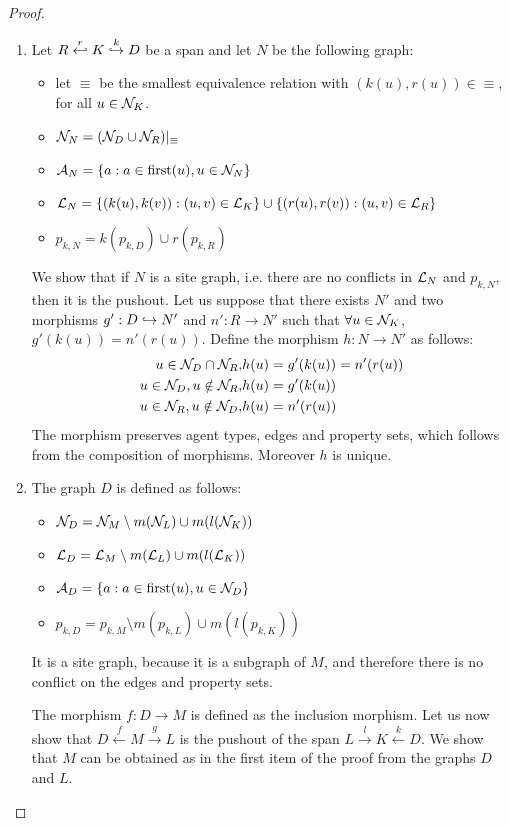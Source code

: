\begin{proof}
  \begin{enumerate}
  \item Let $R\overset{r}{\hookleftarrow}K\overset{k}{\hookrightarrow} D$ be a span and let $N$ be the following graph:
    \begin{itemize}
    \item let $\equiv$ be the smallest equivalence relation with $(k(u),r(u))\in\equiv$, for all $u\in\mathcal{N}_K$.
    \item $\mathcal{N}_N = (\mathcal{N}_D\cup \mathcal{N}_R)|_{\equiv}$
    \item $\mathcal{A}_N = \{a: a\in \text{first}(u), u\in\mathcal{N}_N\}$
    \item $\mathcal{L}_N = \{(k(u),k(v)) : (u,v)\in\mathcal{L}_K\}\cup\{(r(u),r(v)) : (u,v)\in\mathcal{L}_R\}$
    \item $p_{k,N} = k(p_{k,D}) \cup r(p_{k,R})$
    \end{itemize}
    We show that if $N$ is a site graph, i.e. there are no conflicts in $\mathcal{L}_N$ and $p_{k,N}$, then it is the pushout. Let us suppose that there exists $N'$ and two morphisms $g':D\hookrightarrow N'$ and $n':R\to N'$ such that $\forall u\in\mathcal{N}_K$, $g'(k(u)) = n'(r(u))$. Define the morphism $h:N\to N'$ as follows:
    \begin{align*}
      u\in \mathcal{N}_D\cap\mathcal{N}_R, &h(u) = g'(k(u)) = n'(r(u))\\
      u\in \mathcal{N}_D, u\notin\mathcal{N}_R, &h(u) = g'(k(u))\\
      u\in \mathcal{N}_R, u\notin\mathcal{N}_D, &h(u) = n'(r(u))
    \end{align*}
    The morphism preserves agent types, edges and property sets, which follows from the composition of morphisms. Moreover $h$ is unique.

  \item The graph $D$ is defined as follows:
    \begin{itemize}
    \item $\mathcal{N}_D = \mathcal{N}_M\setminus m(\mathcal{N}_L) \cup m(l(\mathcal{N}_K))$
    \item $\mathcal{L}_D = \mathcal{L}_M\setminus m(\mathcal{L}_L) \cup m(l(\mathcal{L}_K))$
    \item $\mathcal{A}_D = \{a: a\in \text{first}(u), u\in\mathcal{N}_D\}$
    \item $p_{k,D} = p_{k,M}\setminus m(p_{k,L}) \cup m(l(p_{k,K}))$
    \end{itemize}
    It is a site graph, because it is a subgraph of $M$, and therefore there is no conflict on the edges and property sets.

    The morphism $f:D\to M$ is defined as the inclusion morphism.
    Let us now show that $D\overset{f}{\leftarrow}M\overset{g}{\rightarrow} L$ is the pushout of the span $L\overset{l}{\rightarrow}K\overset{k}{\leftarrow} D$. We show that $M$ can be obtained as in the first item of the proof from the graphs $D$ and $L$.


\end{enumerate}
\end{proof}
